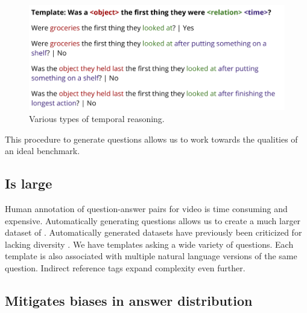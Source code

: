 \documentclass[10pt,twocolumn,letterpaper]{article}
\newcommand{\mgm}[1]{{\color{cyan}{mgm: #1}}}
\begin{document}
\begin{figure}[t]
\begin{center}
\includegraphics[width=0.8\linewidth]{Figures/figure_indirect.png}
\end{center}
   \caption{Various types of temporal reasoning.}
\label{fig:long}
\label{fig:onecol}
\end{figure}



This procedure to generate questions allows us to work towards the qualities of an ideal benchmark.
    
\subsection{Is large}
    
    Human annotation of question-answer pairs for video is time consuming and expensive. Automatically generating questions allows us to create a much larger dataset of \mgm{add here}. Automatically generated datasets have previously been criticized for lacking diversity \cite{yu2019activitynet}. We have \mgm{add} templates asking a wide variety of questions. Each template is also associated with multiple natural language versions of the same question. Indirect reference tags expand complexity even further.
    
    \mgm{make some sort of graphic comparing size?}

\subsection{Mitigates biases in answer distribution}
    
\end{document}
